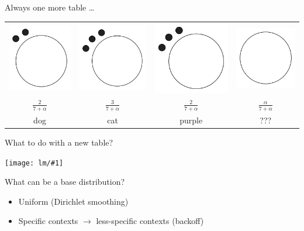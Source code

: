 \documentclass[compress]{beamer}
\newcommand{\gfx}[2]{
\begin{center}
	\texttt{[image: lm/\#1]}
\end{center}
}
\begin{document}
\begin{frame}{Always one more table \dots}

	\begin{center}
	\begin{tabular}{cccc}
	\includegraphics[width=.2\linewidth]{lm/table_2} &
	\includegraphics[width=.2\linewidth]{lm/table_3} &
	\includegraphics[width=.2\linewidth]{lm/table_3} &
         \includegraphics[width=.2\linewidth]{lm/table_0} \\
	 \pause
	 $\frac{2}{7 + \alpha}$ & $\frac{3}{7 + \alpha}$ & $\frac{2}{7 + \alpha}$ & $\frac{\alpha}{7 + \alpha}$ \\
	 \pause
	 dog & cat & purple & \alert<4>{???} \\
	\end{tabular}
	\end{center}


\end{frame}


\begin{frame}{What to do with a new table?}

  \gfx{crp_new_table}{.8}

\pause
\begin{block}{What can be a base distribution?}
\begin{itemize}
  \item Uniform (Dirichlet smoothing)
\pause
  \item Specific contexts $\rightarrow$ less-specific contexts (backoff)
\end{itemize}
\end{block}

\end{frame}
\end{document}
